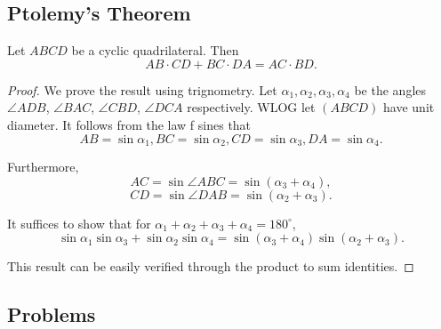 \documentclass[11pt]{scrartcl}
\begin{document}
\subsection{Ptolemy's Theorem}
\begin{thm} Let $ABCD$ be a cyclic quadrilateral.  Then $$AB \cdot CD + BC \cdot DA = AC \cdot BD.$$
\end{thm}
\begin{proof}
We prove the result using trignometry.  Let $\alpha_1, \alpha_2, \alpha_3, \alpha_4$ be the angles $\angle ADB$, $\angle BAC$, $\angle CBD$, $\angle DCA$ respectively.  WLOG let $(ABCD)$ have unit diameter.  It follows from the law f sines that 
$$AB = \sin \alpha_1, BC = \sin \alpha_2, CD = \sin \alpha_3, DA = \sin \alpha_4.$$

Furthermore,
$$AC = \sin \angle ABC = \sin(\alpha_3 + \alpha_4),$$
$$CD = \sin \angle DAB = \sin(\alpha_2 + \alpha_3).$$

It suffices to show that for $\alpha_1 + \alpha_2 + \alpha_3 + \alpha_4 = 180^\circ$, 
$$\sin \alpha_1 \sin \alpha_3 + \sin \alpha_2 \sin \alpha_4 = \sin(\alpha_3 + \alpha_4) \sin (\alpha_2 + \alpha_3).$$

This result can be easily verified through the product to sum identities.
\end{proof}
\subsection{Problems}
\end{document}
